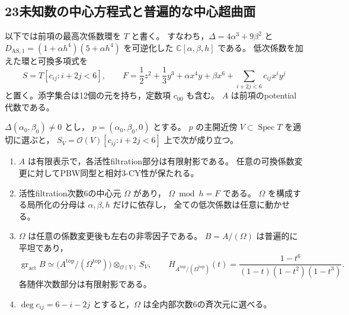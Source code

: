 \subsection{23未知数の中心方程式と普遍的な中心超曲面}

以下では前項の最高次係数環を $T$ と書く。
すなわち，$\Delta=4\alpha^3+9\beta^2$ と
$D_{\mathrm{AS},1}=(1+\alpha h^4)(5+\alpha h^4)$ を可逆化した
$\mathbb C[\alpha,\beta,h]$ である。
低次係数を加えた環と可換多項式を
\[
 S=T[c_{ij}:i+2j<6],\qquad
 F=\frac12z^2+\frac13y^3+\alpha x^4y+\beta x^6
       +\sum_{i+2j<6}c_{ij}x^iy^j
\]
と置く。添字集合は12個の元を持ち，定数項 $c_{00}$ も含む。
$A$ は前項のpotential代数である。

\begin{theorem}\label{thm:degree-one-finite-central-family}
$\Delta(\alpha_0,\beta_0)\ne0$ とし，
$p=(\alpha_0,\beta_0,0)$ とする。
$p$ の主開近傍 $V\subset\operatorname{Spec}T$ を適切に選ぶと，
$S_V=\mathcal O(V)[c_{ij}:i+2j<6]$ 上で次が成り立つ。
\begin{enumerate}
 \item $A$ は有限表示で，各活性filtration部分は有限射影である。
       任意の可換係数変更に対してPBW同型と相対3-CY性が保たれる。
 \item 活性filtration次数6の中心元 $\Omega$ があり，
       $\Omega\bmod h=F$ である。
       $\Omega$ を構成する局所化の分母は $\alpha,\beta,h$ だけに依存し，
       全ての低次係数は任意に動かせる。
 \item $\Omega$ は任意の係数変更後も左右の非零因子である。
       $B=A/(\Omega)$ は普遍的に平坦であり，
       \[
        \operatorname{gr}_{\mathrm{act}}B
         \simeq\bigl(A^{\mathrm{top}}/(\Omega^{\mathrm{top}})\bigr)
                 \otimes_{\mathcal O(V)}S_V,
        \qquad
        H_{A^{\mathrm{top}}/(\Omega^{\mathrm{top}})}(t)
          =\frac{1-t^6}{(1-t)(1-t^2)(1-t^3)}.
       \]
       各随伴次数部分は有限射影である。
 \item $\deg c_{ij}=6-i-2j$ とすると，$\Omega$ は全内部次数6の斉次元に選べる。
\end{enumerate}
\end{theorem}
